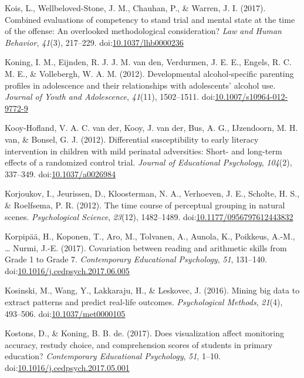 \documentclass[english,man]{apa6}
\begin{document}
\hypertarget{ref-Kois2017}{}
Kois, L., Wellbeloved-Stone, J. M., Chauhan, P., \& Warren, J. I.
(2017). Combined evaluations of competency to stand trial and mental
state at the time of the offense: An overlooked methodological
consideration? \emph{Law and Human Behavior}, \emph{41}(3), 217--229.
doi:\href{https://doi.org/10.1037/lhb0000236}{10.1037/lhb0000236}

\hypertarget{ref-Koning2012}{}
Koning, I. M., Eijnden, R. J. J. M. van den, Verdurmen, J. E. E.,
Engels, R. C. M. E., \& Vollebergh, W. A. M. (2012). Developmental
alcohol-specific parenting profiles in adolescence and their
relationships with adolescents' alcohol use. \emph{Journal of Youth and
Adolescence}, \emph{41}(11), 1502--1511.
doi:\href{https://doi.org/10.1007/s10964-012-9772-9}{10.1007/s10964-012-9772-9}

\hypertarget{ref-VanderKooy-Hofland2012}{}
Kooy-Hofland, V. A. C. van der, Kooy, J. van der, Bus, A. G.,
IJzendoorn, M. H. van, \& Bonsel, G. J. (2012). Differential
susceptibility to early literacy intervention in children with mild
perinatal adversities: Short- and long-term effects of a randomized
control trial. \emph{Journal of Educational Psychology}, \emph{104}(2),
337--349. doi:\href{https://doi.org/10.1037/a0026984}{10.1037/a0026984}

\hypertarget{ref-Korjoukov2012}{}
Korjoukov, I., Jeurissen, D., Kloosterman, N. A., Verhoeven, J. E.,
Scholte, H. S., \& Roelfsema, P. R. (2012). The time course of
perceptual grouping in natural scenes. \emph{Psychological Science},
\emph{23}(12), 1482--1489.
doi:\href{https://doi.org/10.1177/0956797612443832}{10.1177/0956797612443832}

\hypertarget{ref-Korpipaa2017}{}
Korpipää, H., Koponen, T., Aro, M., Tolvanen, A., Aunola, K., Poikkeus,
A.-M., \ldots{} Nurmi, J.-E. (2017). Covariation between reading and
arithmetic skills from Grade 1 to Grade 7. \emph{Contemporary
Educational Psychology}, \emph{51}, 131--140.
doi:\href{https://doi.org/10.1016/j.cedpsych.2017.06.005}{10.1016/j.cedpsych.2017.06.005}

\hypertarget{ref-Kosinski2013}{}
Kosinski, M., Wang, Y., Lakkaraju, H., \& Leskovec, J. (2016). Mining
big data to extract patterns and predict real-life outcomes.
\emph{Psychological Methods}, \emph{21}(4), 493--506.
doi:\href{https://doi.org/10.1037/met0000105}{10.1037/met0000105}

\hypertarget{ref-Kostons2017}{}
Kostons, D., \& Koning, B. B. de. (2017). Does visualization affect
monitoring accuracy, restudy choice, and comprehension scores of
students in primary education? \emph{Contemporary Educational
Psychology}, \emph{51}, 1--10.
doi:\href{https://doi.org/10.1016/j.cedpsych.2017.05.001}{10.1016/j.cedpsych.2017.05.001}
\end{document}
